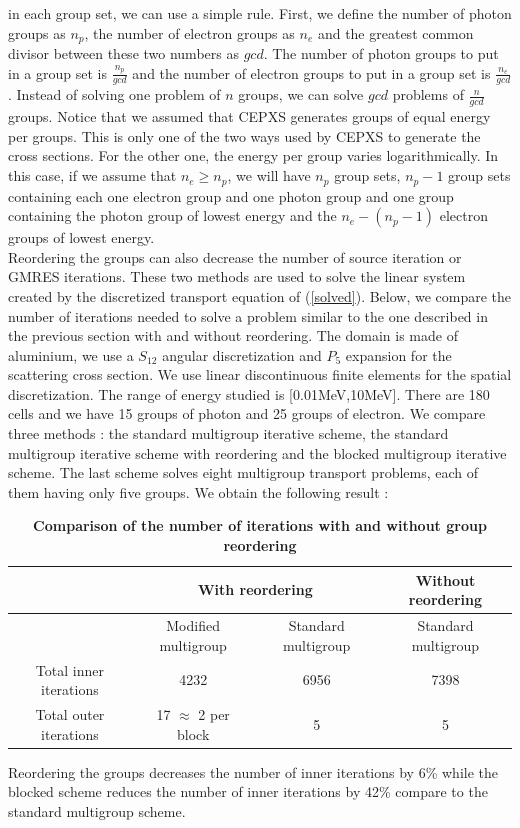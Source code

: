 in each group set, we can use a simple rule. First, we define the number of
photon groups as $n_p$, the number of electron groups as $n_e$ and the 
greatest common divisor between these two numbers as $gcd$. The number of
photon groups to put in a group set is $\frac{n_p}{gcd}$ and the number 
of electron groups to put in a group set is $\frac{n_e}{gcd}$. Instead 
of solving one problem of $n$ groups, we can solve $gcd$ problems of 
$\frac{n}{gcd}$ groups. Notice that we assumed that CEPXS generates groups of
equal energy per groups. This is only one of the two ways used by CEPXS to
generate the cross sections. For the other one, the energy per group varies 
logarithmically. In this case, if we assume that $n_e \geq n_p$, we will have 
$n_p$ group sets, $n_p-1$ group sets containing each one electron group and one 
photon group and one group containing the photon group of lowest energy and 
the $n_e-(n_p-1)$ electron groups of lowest energy.\\
Reordering the groups can also decrease the number of source iteration or
GMRES iterations. These two methods are used to solve the linear system 
created by the discretized transport equation of (\ref{solved}).
Below, we compare the number of iterations needed to
solve a problem similar to the one described in the previous section with and
without reordering. The domain is
made of aluminium, we use a $S_{12}$ angular discretization and $P_5$ expansion
for the scattering cross section. We use linear discontinuous finite elements 
for the spatial discretization. The range of energy studied is [0.01MeV,10MeV]. 
There are 180 cells and we have 15 groups of photon and 25 groups of electron.
We compare three methods : the standard multigroup iterative scheme, the
standard multigroup iterative scheme with reordering and the blocked
multigroup iterative scheme. The last scheme solves eight multigroup
transport problems, each of them having only five groups.
We obtain the following result :
\begin{table}[H]
\begin{center}
\caption{\bf{Comparison of the number of iterations with and without group
reordering}}
\begin{tabular}{|c|c|c|c|}
\hline
&\multicolumn{2}{c|}{With reordering} & Without reordering\\
\hline
&Modified multigroup & Standard multigroup & Standard multigroup\\
\hline
Total inner iterations & 4232 & 6956 & 7398\\ 
Total outer iterations & 17 $\approx$ 2 per block & 5 & 5\\
\hline
\end{tabular}
\end{center}
\end{table}
Reordering the groups decreases the number of inner iterations by 6\% while
the blocked scheme reduces the number of inner iterations by 42\% compare to the
standard multigroup scheme.
